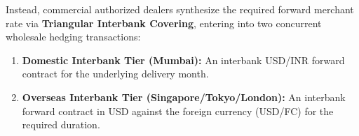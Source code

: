 Instead, commercial authorized dealers synthesize the required forward merchant rate via \textbf{Triangular Interbank Covering}, entering into two concurrent wholesale hedging transactions:
\begin{enumerate}[leftmargin=*]
    \item \textbf{Domestic Interbank Tier (Mumbai):} An interbank USD/INR forward contract for the underlying delivery month.
    \item \textbf{Overseas Interbank Tier (Singapore/Tokyo/London):} An interbank forward contract in USD against the foreign currency (USD/FC) for the required duration.
\end{enumerate}

